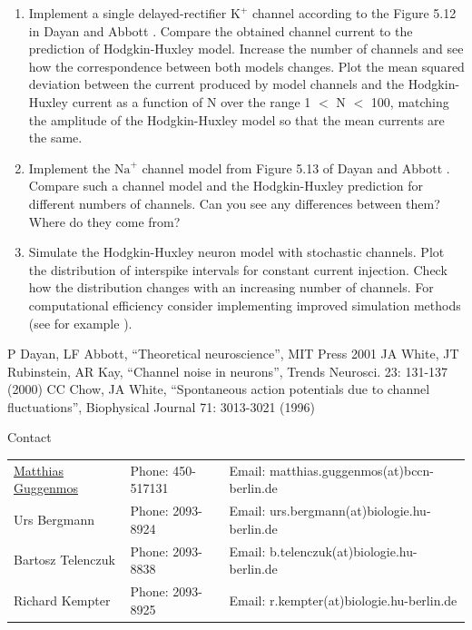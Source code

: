 \documentclass[12pt]{article}
\newcommand{\K}{\text{K}}
\newcommand{\Na}{\text{Na}}
\begin{document}
\begin{enumerate}
    \item Implement a single delayed-rectifier $\K^+$ channel according to
       the Figure 5.12 in Dayan and Abbott \cite{dayan2001}. Compare
       the obtained channel current to the prediction of Hodgkin-Huxley
       model. Increase the number of channels and see how the
       correspondence between both models changes. Plot the mean
       squared deviation between the current produced by model
       channels and the Hodgkin-Huxley current as a function of N
       over the range 1 $<$ N $<$ 100, matching the amplitude of the
       Hodgkin-Huxley model so that the mean currents are the same.
   \item  Implement the $\Na^+$ channel model from Figure 5.13 of Dayan
       and Abbott \cite{dayan2001}. Compare such a channel model and
       the Hodgkin-Huxley prediction for different numbers of channels.
       Can you see any differences between them? Where do they come
       from?
    \item Simulate the Hodgkin-Huxley neuron model with stochastic
        channels. Plot the distribution of interspike intervals for
        constant current injection. Check how the distribution changes
        with an increasing number of channels. For computational
        efficiency consider implementing improved simulation
        methods (see for example \cite{white2000,chow1996}).
   
   \end{enumerate}
\vspace{1cm}

\begin{thebibliography}{7}
     P Dayan, LF Abbott, ``Theoretical neuroscience'',
        MIT Press 2001
     JA White, JT Rubinstein, AR Kay, ``Channel
        noise in neurons'', Trends Neurosci. 23: 131-137 (2000)
     CC Chow, JA White, ``Spontaneous action
      potentials due to channel fluctuations'', Biophysical Journal
      71: 3013-3021 (1996)
\end{thebibliography}

\vfill
\centerline{\CAP Contact}
\CAP

\begin{tabular}{lll}
\underline{Matthias Guggenmos} & Phone: 450-517131 & Email: matthias.guggenmos(at)bccn-berlin.de \\
Urs Bergmann & Phone: 2093-8924 & Email: urs.bergmann(at)biologie.hu-berlin.de \\
Bartosz Telenczuk & Phone: 2093-8838 & Email: b.telenczuk(at)biologie.hu-berlin.de \\
Richard Kempter & Phone: 2093-8925 & Email: r.kempter(at)biologie.hu-berlin.de \\
\end{tabular}
\end{document}
